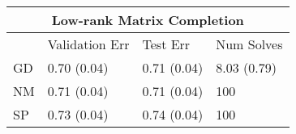 \documentclass[12pt,letterpaper]{article}
\begin{document}
\begin{table}
	\vspace{0.5cm}
	
	\begin{tabular}{| l | l | l | l |}
		\hline
		\multicolumn{4}{|c|}{Low-rank Matrix Completion}\\
		\hline
		& Validation Err & Test Err &  Num Solves\\
		\hline
		GD  & 0.70 (0.04) &  0.71 (0.04) & 8.03 (0.79) \\
		\hline
		NM & 0.71 (0.04) & 0.71 (0.04) & 100 \\
		\hline
		SP & 0.73 (0.04) & 0.74 (0.04) & 100\\
		\hline
	\end{tabular}
	
\end{table}

%
\end{document}
